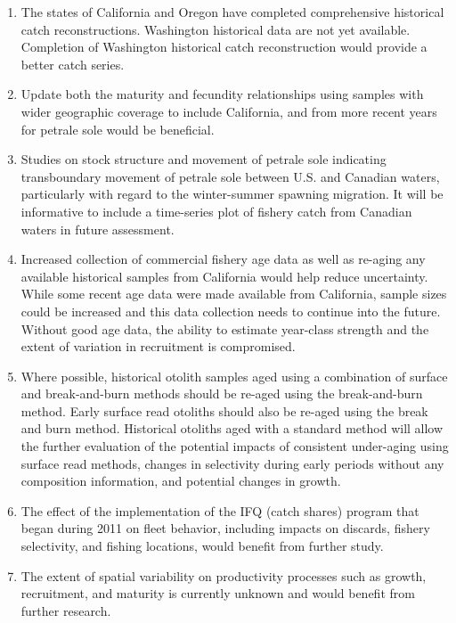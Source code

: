 \documentclass[12pt,]{article}
\begin{document}
\begin{enumerate}

\item The states of California and Oregon have completed comprehensive historical catch reconstructions. Washington historical data are not yet available. Completion of Washington historical catch reconstruction would provide a better catch series.

\item Update both the maturity and fecundity relationships using samples with wider geographic coverage to include California, and from more recent years for petrale sole would be beneficial. 

\item Studies on stock structure and movement of petrale sole indicating transboundary movement of petrale sole between U.S. and Canadian waters, particularly with regard to the winter-summer spawning migration. It will be informative to include a time-series plot of fishery catch from Canadian waters in future assessment.

\item Increased collection of commercial fishery age data as well as re-aging any available historical samples from California would help reduce uncertainty. While some recent age data were made available from California, sample sizes could be increased and this data collection needs to continue into the future. Without good age data, the ability to estimate year-class strength and the extent of variation in recruitment is compromised.

\item Where possible, historical otolith samples aged using a combination of surface and break-and-burn methods should be re-aged using the break-and-burn method. Early surface read otoliths should also be re-aged using the break and burn method. Historical otoliths aged with a standard method will allow the further evaluation of the potential impacts of consistent under-aging using surface read methods, changes in selectivity during early periods without any composition information, and potential changes in growth.

\item The effect of the implementation of the IFQ (catch shares) program that began during 2011 on fleet behavior, including impacts on discards, fishery selectivity, and fishing locations, would benefit from further study.

\item The extent of spatial variability on productivity processes such as growth, recruitment, and maturity is currently unknown and would benefit from further research. 


\end{enumerate}
\end{document}

